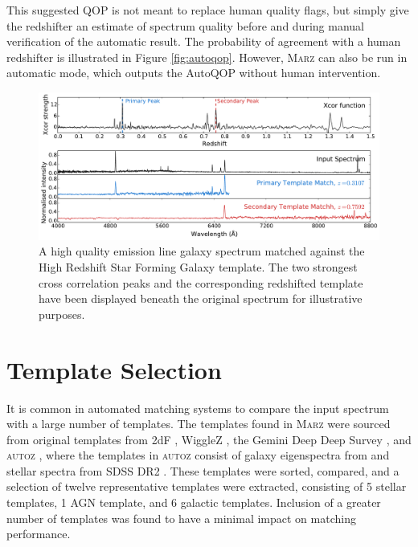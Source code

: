 \documentclass[5p]{elsarticle}
\newcommand{\autoz}{\textsc{autoz}}
\newcommand{\marz}{\textsc{Marz}}
\begin{document}
This suggested QOP is not meant to replace human quality flags, but simply give the redshifter an estimate of spectrum quality before and during manual verification of the automatic result. The probability of agreement with a human redshifter is illustrated in Figure \ref{fig:autoqop}.  However, \marz{} can also be run in automatic mode, which outputs the AutoQOP without human intervention.






\begin{figure}[h]
\centering
\includegraphics[width=\textwidth]{xcors.pdf}
\caption{A high quality emission line galaxy spectrum matched against the High Redshift Star Forming Galaxy template. The two strongest cross correlation peaks and the corresponding redshifted template have been displayed beneath the original spectrum for illustrative purposes.}
\label{fig:xcors}
\end{figure}







\section{Template Selection} \label{sec:templates}





It is common in automated matching systems to compare the input spectrum with a large number of templates. The templates found in \marz{} were sourced from original templates from 2dF \citep{colless2001}, WiggleZ \citep{Drinkwater21012010}, the Gemini Deep Deep Survey \citet{abraham2004}, and \autoz{} \citep{baldry2014galaxy}, where the templates in \autoz{}  consist of galaxy eigenspectra from \citet{bolton2012} and stellar spectra from SDSS DR2 \citep{SubbaRao2002}. These templates were sorted, compared, and a selection of twelve representative templates were extracted, consisting of 5 stellar templates, 1 AGN template, and 6 galactic templates. Inclusion of a greater number of templates was found to have a minimal impact on matching performance.
\end{document}
